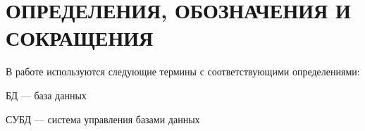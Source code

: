 \section*{ОПРЕДЕЛЕНИЯ, ОБОЗНАЧЕНИЯ И СОКРАЩЕНИЯ}
В работе используются следующие термины с соответствующими определениями:

БД --- база данных

СУБД --- система управления базами данных

\pagebreak
